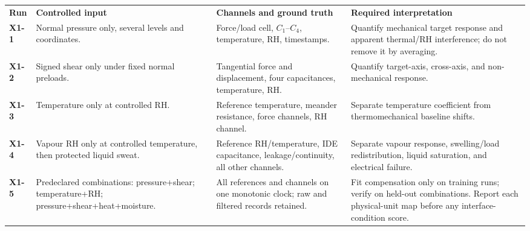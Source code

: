 \begingroup
\fontsize{7.65}{8.95}\selectfont
\setlength{\tabcolsep}{2.6pt}\renewcommand{\arraystretch}{1.06}
\begin{tabularx}{\linewidth}{>{\raggedright\arraybackslash\bfseries\color{AUBRed}}p{1.05cm}Y Y Y}
\color{white}\textbf{Run} & \color{white}\textbf{Controlled input} &
\color{white}\textbf{Channels and ground truth} &
\color{white}\textbf{Required interpretation} \\
X1-1 & Normal pressure only, several levels and coordinates. & Force/load cell,
$C_1$--$C_4$, temperature, RH, timestamps. & Quantify mechanical target
response and apparent thermal/RH interference; do not remove it by averaging. \\
X1-2 & Signed shear only under fixed normal preloads. & Tangential force and
displacement, four capacitances, temperature, RH. & Quantify target-axis,
cross-axis, and non-mechanical response. \\
X1-3 & Temperature only at controlled RH. & Reference temperature, meander
resistance, force channels, RH channel. & Separate temperature coefficient from
thermomechanical baseline shifts. \\
X1-4 & Vapour RH only at controlled temperature, then protected liquid sweat. &
Reference RH/temperature, IDE capacitance, leakage/continuity, all other
channels. & Separate vapour response, swelling/load redistribution, liquid
saturation, and electrical failure. \\
X1-5 & Predeclared combinations: pressure+shear; temperature+RH;
pressure+shear+heat+moisture. & All references and channels on one monotonic
clock; raw and filtered records retained. & Fit compensation only on training
runs; verify on held-out combinations. Report each physical-unit map before
any interface-condition score. \\
\end{tabularx}
\endgroup

